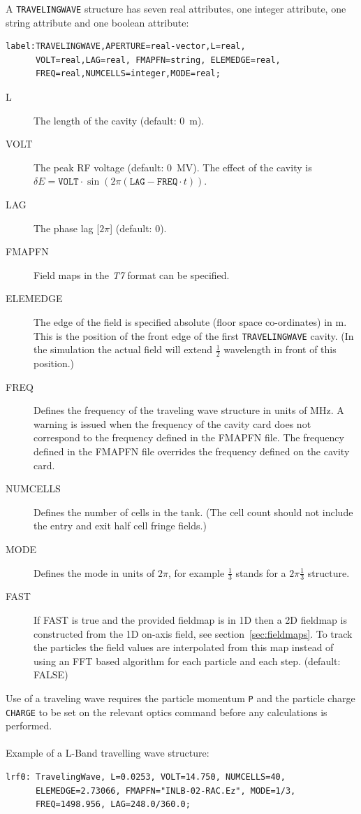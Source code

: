 \noindent A \texttt{TRAVELINGWAVE} structure has seven real attributes, one integer attribute, one string attribute and one boolean attribute:
\begin{verbatim}
label:TRAVELINGWAVE,APERTURE=real-vector,L=real,
      VOLT=real,LAG=real, FMAPFN=string, ELEMEDGE=real,
      FREQ=real,NUMCELLS=integer,MODE=real;
\end{verbatim}

\begin{description}
\item[L]
  The length of the cavity (default: 0~m).
\item[VOLT]
  The peak RF voltage (default: 0~MV).
  The effect of the cavity is
  $\delta E=\mathtt{VOLT}\cdot\sin(2\pi(\mathtt{LAG}- \mathtt{FREQ}\cdot t))$.
\item[LAG]
  The phase lag [$2\pi$] (default: 0).
\item[FMAPFN]
  Field maps in the {\em T7} format can be specified.
\item[ELEMEDGE]
  The edge of the field is specified absolute (floor space co-ordinates) in m. This is the position of the front edge
  of the first \texttt{TRAVELINGWAVE} cavity. (In the simulation the actual field will extend $\frac{1}{2}$ wavelength
  in front of this position.)
\item[FREQ]
  Defines the frequency of the traveling wave structure in units of MHz. A warning is issued when the frequency of
  the cavity card does not correspond to the frequency defined in the  FMAPFN file. The frequency defined in the FMAPFN
  file overrides the frequency defined on the cavity card. 
\item[NUMCELLS]
  Defines the number of cells in the tank. (The cell count should not include the entry and exit half cell fringe fields.)
\item[MODE]
Defines the mode in units of $2\pi$, for example $\frac{1}{3}$ stands for a $2\pi\frac{1}{3}$ structure.
\item[FAST]
If FAST is true and the provided fieldmap is in 1D then a 2D fieldmap is constructed from the 1D on-axis field, see section~\ref{sec:fieldmaps}. To track the particles the field values are interpolated from this map instead of using an FFT based algorithm for each particle and each step. (default: FALSE)
\end{description}

\noindent Use of a traveling wave requires the particle momentum \texttt{P}
and the particle charge \texttt{CHARGE} to be set on the relevant 
optics command before any calculations is performed.
\\\\
\noindent Example of a L-Band travelling wave structure:
\begin{verbatim}
lrf0: TravelingWave, L=0.0253, VOLT=14.750, NUMCELLS=40, 
      ELEMEDGE=2.73066, FMAPFN="INLB-02-RAC.Ez", MODE=1/3, 
      FREQ=1498.956, LAG=248.0/360.0;
\end{verbatim}

